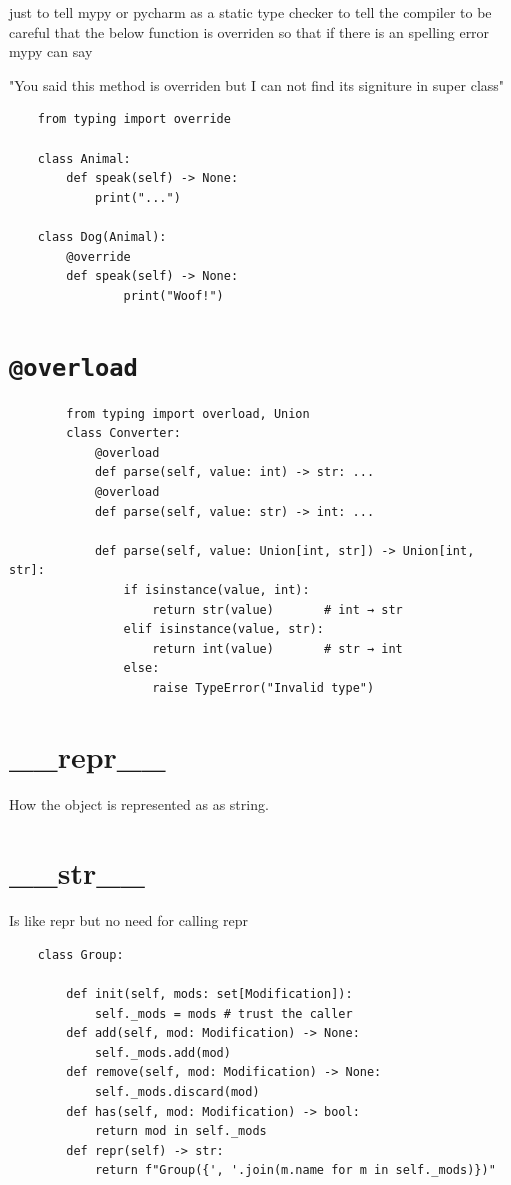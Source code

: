 just to tell mypy or pycharm as a static type checker to tell the compiler to be careful that the below function is overriden so that if there is an spelling error mypy can say

"You said this method is overriden but I can not find its signiture in super class"

\begin{verbatim}
    from typing import override

    class Animal:
        def speak(self) -> None:
            print("...")

    class Dog(Animal):
        @override
        def speak(self) -> None:
                print("Woof!")
\end{verbatim}

\section{\texttt{@overload}}
    \begin{verbatim}
        from typing import overload, Union
        class Converter:
            @overload
            def parse(self, value: int) -> str: ...
            @overload
            def parse(self, value: str) -> int: ...
        
            def parse(self, value: Union[int, str]) -> Union[int, str]:
                if isinstance(value, int):
                    return str(value)       # int → str
                elif isinstance(value, str):
                    return int(value)       # str → int
                else:
                    raise TypeError("Invalid type")
    \end{verbatim}

\section{\_\_repr\_\_}

How the object is represented as as string.

\section{\_\_str\_\_}


Is like repr but no need for calling repr

\begin{verbatim}
    class Group:

        def init(self, mods: set[Modification]):
            self._mods = mods # trust the caller
        def add(self, mod: Modification) -> None:
            self._mods.add(mod)
        def remove(self, mod: Modification) -> None:
            self._mods.discard(mod)
        def has(self, mod: Modification) -> bool:
            return mod in self._mods
        def repr(self) -> str:
            return f"Group({', '.join(m.name for m in self._mods)})"
\end{verbatim}

